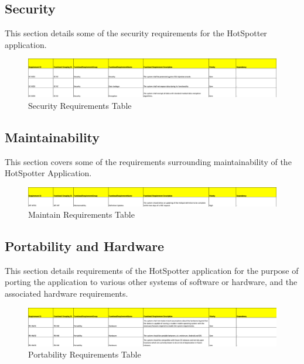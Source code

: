 \documentclass{scrreprt}
\begin{document}
\subsection{Security}
This section details some of the security requirements for the HotSpotter application.
\begin{figure}[H]
	\centering
	\includegraphics[page=1, width=0.95\linewidth]{COMP30830-SecurityRequirements}
	\caption{Security Requirements Table}
	\label{SR}
\end{figure}


\subsection{Maintainability}
This section covers some of the requirements surrounding maintainability of the HotSpotter Application.
\begin{figure}[H]
	\centering
	\includegraphics[page=1, width=0.95\linewidth]{COMP30830-MaintainRequirements}
	\caption{Maintain Requirements Table}
	\label{MR}
\end{figure}


\subsection{Portability and Hardware}
This section details requirements of the HotSpotter
application for the purpose of porting the application to various other systems of software or hardware, and the associated hardware requirements. \\
\begin{figure}[H]
	\centering
	\includegraphics[page=1, width=0.95\linewidth]{COMP30830-PortabilityRequirements}
	\caption{Portability Requirements Table}
	\label{PortR}
\end{figure}
\end{document}
